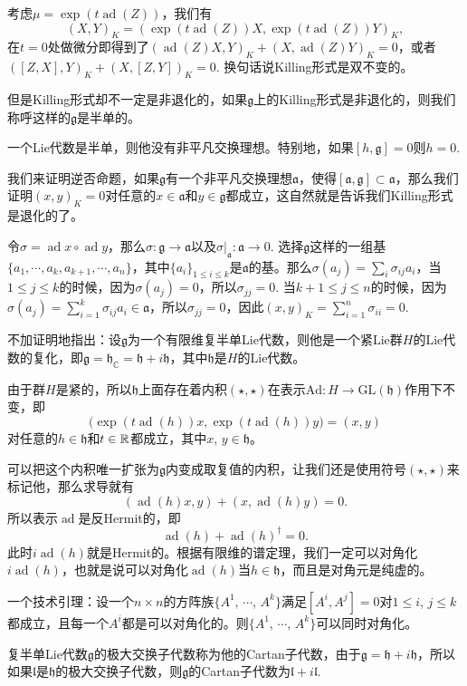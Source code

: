 \documentclass[11pt]{article}
\theoremstyle{definition}
\theoremstyle{plain}
\newcommand{\cc}{\mathbb{C}}
\newcommand{\lag}{{\mathfrak{g}}}
\DeclareMathOperator{\ad}{ad}
\begin{document}
考虑$\mu=\exp(t\ad(Z))$，我们有
\[
	(X,Y)_K=(\exp(t\ad(Z))X,\exp(t\ad(Z))Y)_K,
\]
在$t=0$处做微分即得到了$(\ad(Z)X,Y)_K+(X,\ad(Z)Y)_K=0$，或者$([Z,X],Y)_K+(X,[Z,Y])_K=0$. 换句话说Killing形式是双不变的。

但是Killing形式却不一定是非退化的，如果$\lag$上的Killing形式是非退化的，则我们称呼这样的$\lag$是半单的。

{\pro 一个Lie代数是半单，则他没有非平凡交换理想。特别地，如果$[h,\lag]=0$则$h=0$.\endpro}

\proof 我们来证明逆否命题，如果$\lag$有一个非平凡交换理想$\mathfrak{a}$，使得$[\mathfrak{a},\lag]\subset \mathfrak{a}$，那么我们证明$(x,y)_K=0$对任意的$x\in \mathfrak{a}$和$y\in \lag$都成立，这自然就是告诉我们Killing形式是退化的了。

令$\sigma=\ad x\circ \ad y$，那么$\sigma:\lag\to \mathfrak{a}$以及$\sigma|_\mathfrak{a}:\mathfrak{a}\to 0$. 选择$\lag$这样的一组基$\{a_1,\cdots,a_k,a_{k+1},\cdots,a_{n}\}$，其中$\{a_i\}_{1\leq i \leq k}$是$\mathfrak{a}$的基。那么$\sigma(a_j)=\sum_i\sigma_{ij} a_i$，当$1\leq j\leq k$的时候，因为$\sigma(a_j)=0$，所以$\sigma_{jj}=0$. 当$k+1\leq j \leq n$的时候，因为$\sigma(a_j)=\sum_{i=1}^k\sigma_{ij} a_i\in\mathfrak{a}$，所以$\sigma_{jj}=0$，因此$(x,y)_K=\sum_{i=1}^n\sigma_{ii}=0$.\endproof

{{\thm 不加证明地指出：设$\lag$为一个有限维复半单Lie代数，则他是一个紧Lie群$H$的Lie代数的复化，即$\lag=\mathfrak{h}_{\cc}=\mathfrak{h}+i\mathfrak{h}$，其中$\mathfrak{h}$是$H$的Lie代数。\endthm}}

由于群$H$是紧的，所以$\mathfrak{h}$上面存在着内积$(\star,\star)$在表示$\mathrm{Ad}:H\to \mathrm{GL}(\mathfrak{h})$作用下不变，即
\[
	\bigl(\exp(t\ad(h))x,\exp(t\ad(h))y\bigr)=(x,y)
\]
对任意的$h\in\mathfrak{h}$和$t\in \mathbb{R}$都成立，其中$x$, $y\in\mathfrak{h}$。

可以把这个内积唯一扩张为$\lag$内变成取复值的内积，让我们还是使用符号$(\star,\star)$来标记他，那么求导就有
\[
	(\ad(h)x,y)+(x,\ad(h)y)=0.
\]
所以表示$\ad$是反Hermit的，即
\[
	\ad(h)+\ad(h)^\dag=0.
\]
此时$i\ad(h)$就是Hermit的。根据有限维的谱定理，我们一定可以对角化$i\ad(h)$，也就是说可以对角化$\ad(h)$当$h\in \mathfrak{h}$，而且是对角元是纯虚的。

{\lem 一个技术引理：设一个$n\times n$的方阵族$\{A^1$, $\cdots$, $A^k\}$满足$[A^i,A^j]=0$对$1\leq i$, $j\leq k$都成立，且每一个$A^i$都是可以对角化的。则$\{A^1$, $\cdots$, $A^k\}$可以同时对角化。\endlem}

\para 复半单Lie代数$\lag$的极大交换子代数称为他的Cartan子代数，由于$\lag=\mathfrak{h}+i\mathfrak{h}$，所以如果$\mathfrak{l}$是$\mathfrak{h}$的极大交换子代数，则$\lag$的Cartan子代数为$\mathfrak{l}+i\mathfrak{l}$.
\end{document}
